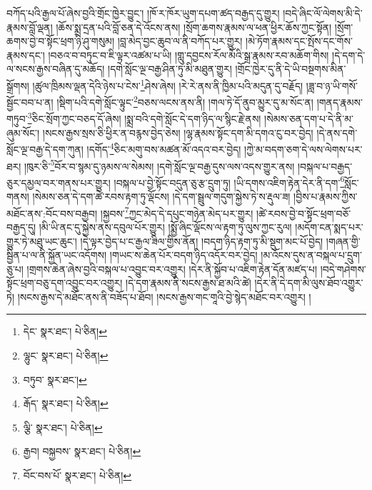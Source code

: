 བཀོད་པའི་རྒྱལ་པོ་ཞེས་བྱའི་གྲོང་ཁྱེར་བྱུང་། །ཁོ་ར་ཁོར་ཡུག་དཔག་ཚད་བརྒྱད་དུ་གྱུར། །བདེ་ཞིང་ལོ་ལེགས་མི་དེ་རྣམས་བློ་ལྡན། །ཆོས་སྨྲ་དྲན་པའི་བློ་ཅན་དེ་འོངས་ནས། །སྲོག་ཆགས་རྣམས་ལ་ཕན་ཕྱིར་ཆོས་ཀྱང་སྟོན། །སྲོག་ཆགས་བྱེ་བ་སྟོང་ཕྲག་ཉི་ཤུ་གསུམ། །བླ་མེད་བྱང་ཆུབ་ལ་ནི་བཀོད་པར་གྱུར། །མེ་ཏོག་རྣམས་དང་སྤོས་དང་གོས་རྣམས་དང་། །བཅའ་བ་བཏུང་བ་ཇི་ལྟར་འཚམ་པ་ཡི། །གླུ་དབྱངས་རོལ་མོའི་སྒྲ་རྣམས་རབ་མཆོག་གིས། །དེ་དག་དེ་ལ་སངས་རྒྱས་བཞིན་དུ་མཆོད། །དགེ་སློང་ལྔ་བརྒྱ་ཤིན་ཏུ་མི་མཐུན་གྱུར། །གྲོང་ཁྱེར་དུ་ནི་དེ་ཡི་བསྔགས་མིན་སྒྲོགས། །ཚུལ་ཁྲིམས་ལྡན་དེའི་ཉེས་པ་ངེས་\footnote{དེང་  སྣར་ཐང་།  པེ་ཅིན། }ཤེས་ཞེས། །རེ་རེ་ནས་ནི་ཁྱིམ་པའི་མདུན་དུ་བརྗོད། །ཟླ་བ་ཉ་ཡི་གསོ་སྦྱོང་བབ་པ་ན། །སྡིག་པའི་དགེ་སློང་ལྟུང་\footnote{ལྷུང་  སྣར་ཐང་།  པེ་ཅིན། }བཅས་ལངས་ནས་ནི། །གལ་ཏེ་དོ་ནུབ་མྱུར་དུ་མ་སོང་ན། །གནད་རྣམས་གཏུབ་\footnote{བཏུབ་  སྣར་ཐང་། }ཅིང་སྲོག་ཀྱང་བཅད་དོ་ཞེས། །སྨྲ་བའི་དགེ་སློང་དེ་དག་ཉིད་ལ་སྙིང་རྗེ་ནས། །སེམས་ཅན་དག་པ་དེ་ནི་མ་ཞུམ་སོང་། །སངས་རྒྱས་སྲས་ཅི་ཕྱིར་ན་བརྙས་བྱེད་ཅེས། །ལྷ་རྣམས་སྟོང་དག་མི་དགའ་ངུ་བར་བྱེད། །དེ་ནས་དགེ་སློང་ལྔ་བརྒྱ་དེ་དག་ཀུན། །དགོད་\footnote{རྒོད་  སྣར་ཐང་།  པེ་ཅིན། }ཅིང་མགུ་བས་མཚན་མོ་འདའ་བར་བྱེད། །ཀྱེ་མ་བདག་ཅག་དེ་ལས་ལེགས་པར་ཐར། །ཁུར་ཅི་\footnote{ལྕི་  སྣར་ཐང་།  པེ་ཅིན། }བོར་བ་སྙམ་དུ་ཉམས་ལ་སེམས། །དགེ་སློང་ལྔ་བརྒྱ་དུས་ལས་འདས་གྱུར་ནས། །བསྐལ་པ་བརྒྱད་ཅུར་དམྱལ་བར་གནས་པར་གྱུར། །བསྐལ་པ་བྱེ་སྟོང་བདུན་ཅུ་རྩ་དྲུག་ཏུ། །ཡི་དགས་འཇིག་རྟེན་དེར་ནི་དག་\footnote{རྒྱབ། བསྐྱབས་  སྣར་ཐང་།  པེ་ཅིན། }སློང་གནས། །སེམས་ཅན་དེ་དག་ཚེ་རབས་རྟག་ཏུ་ལྡོངས། །དེ་དག་སྦྲུལ་གདུག་སྐྱེས་ཏེ་ས་རྡུལ་ཟ། །བྱིས་པ་རྣམས་ཀྱིས་མཐོང་ནས་:བོང་བས་བརྒྱབ། །སྐྱབས་\footnote{བོང་བས་པོ་  སྣར་ཐང་།  པེ་ཅིན། }ཀྱང་མེད་དེ་དཔུང་གཉེན་མེད་པར་གྱུར། །ཚེ་རབས་བྱེ་བ་སྟོང་ཕྲག་བཅོ་བརྒྱད་དུ། །མི་ཡི་ནང་དུ་སྐྱེས་ནས་དབུལ་པོར་གྱུར། །སྨྱོ་ཞིང་ལྡོངས་ལ་རྟག་ཏུ་ལུས་ཀྱང་རུལ། །མདོག་ངན་སྨད་པར་གྱུར་ཏེ་མཐུ་ཡང་ཆུང་། །དེ་ལྟར་བྱེད་པ་ང་རྒྱལ་ཟིལ་གྱིས་ནོན། །བདག་ཉིད་རྟག་ཏུ་མི་སྡུག་མང་པོ་བྱེད། །གཞན་གྱི་སྦྱིན་པ་ལ་ནི་སྐྱོན་ཡང་འདོགས། །གཡང་ས་ཆེན་པོར་བདག་ཉིད་འདོར་བར་བྱེད། །མ་འོངས་དུས་ན་བསྐལ་པ་དྲུག་ཅུ་པ། །གྲགས་ཆེན་ཞེས་བྱའི་བསྐལ་པ་འབྱུང་བར་འགྱུར། །དེར་ནི་སྐྱོབ་པ་འཇིག་རྟེན་དོན་མཛད་པ། །བདེ་གཤེགས་སྟོང་ཕྲག་བཅུ་དག་འབྱུང་བར་འགྱུར། །དེ་དག་རྣམས་ནི་སངས་རྒྱས་ཐ་མའི་ཚེ། །དེར་ནི་དེ་དག་མི་ལུས་ཐོབ་འགྱུར་ཏེ། །སངས་རྒྱས་དེ་མཐོང་ནས་ནི་བཟོད་པ་ཐོབ། །སངས་རྒྱས་གང་གཱའི་བྱེ་སྙེད་མཐོང་བར་འགྱུར། །
